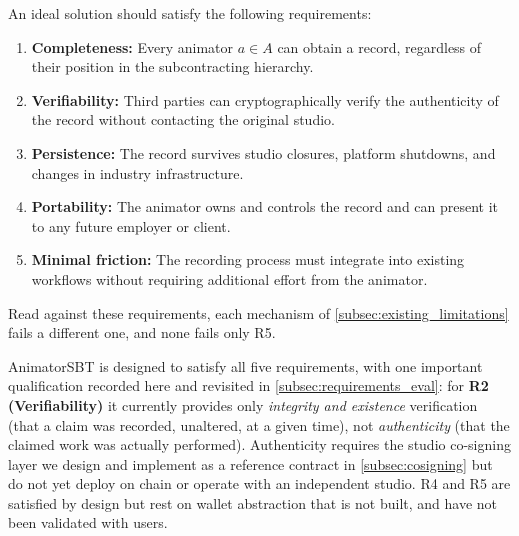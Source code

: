 An ideal solution should satisfy the following requirements:

\begin{enumerate}
  \item[\textbf{R1}] \textbf{Completeness:} Every animator $a \in A$ can obtain a record,
    regardless of their position in the subcontracting hierarchy.
  \item[\textbf{R2}] \textbf{Verifiability:} Third parties can cryptographically verify
    the authenticity of the record without contacting the original studio.
  \item[\textbf{R3}] \textbf{Persistence:} The record survives studio closures,
    platform shutdowns, and changes in industry infrastructure.
  \item[\textbf{R4}] \textbf{Portability:} The animator owns and controls the record
    and can present it to any future employer or client.
  \item[\textbf{R5}] \textbf{Minimal friction:} The recording process must integrate
    into existing workflows without requiring additional effort from the animator.
\end{enumerate}

Read against these requirements, each mechanism of
\cref{subsec:existing_limitations} fails a different one, and none fails only R5.

AnimatorSBT is designed to satisfy all five requirements, with one important
qualification recorded here and revisited in \cref{subsec:requirements_eval}:
for \textbf{R2 (Verifiability)} it currently provides only \emph{integrity and
existence} verification (that a claim was recorded, unaltered, at a given time),
not \emph{authenticity} (that the claimed work was actually performed).
Authenticity requires the studio co-signing layer we design and implement as a
reference contract in \cref{subsec:cosigning} but do not yet deploy on chain or
operate with an independent studio. R4 and R5 are satisfied by design but rest on
wallet abstraction that is not built, and have not been validated with users.
